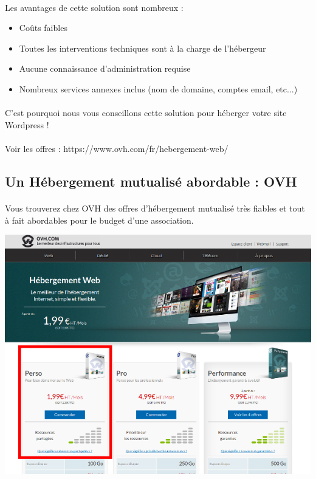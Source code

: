 \documentclass[10pt,a4paper]{article}
\begin{document}
\paragraph{}Les avantages de cette solution sont nombreux :
\begin{itemize}
\item Coûts faibles
\item Toutes les interventions techniques sont à la charge de l'hébergeur
\item Aucune connaissance d'administration requise
\item Nombreux services annexes inclus (nom de domaine, comptes email, etc...)
\end{itemize}
\paragraph{}C'est pourquoi nous vous conseillons cette solution pour héberger votre site Wordpress !
\paragraph{}Voir les offres : https://www.ovh.com/fr/hebergement-web/
\subsection{Un Hébergement mutualisé abordable : OVH}
\paragraph{}Vous trouverez chez OVH des offres d'hébergement mutualisé très fiables et tout à fait abordables pour le budget d'une association.
\begin{center}
\includegraphics[scale=0.5]{img/0008.png}
\end{center}
\end{document}

